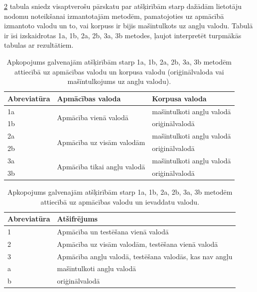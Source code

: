 \ref{tab:legend} tabula sniedz visaptverošu pārskatu par atšķirībām starp dažādām lietotāju nodomu noteikšanai izmantotajām metodēm, pamatojoties uz apmācībā izmantoto valodu un to, vai korpuss ir bijis mašīntulkots uz angļu valodu. Tabulā ir īsi izskaidrotas 1a, 1b, 2a, 2b, 3a, 3b metodes, ļaujot interpretēt turpmākās tabulas ar rezultātiem.


\begin{table}[htbp]
  \centering
  \caption{Apkopojums galvenajām atšķirībām starp 1a, 1b, 2a, 2b, 3a, 3b metodēm attiecībā uz apmācības valodu un korpusa valodu (oriģinālvaloda vai mašīntulkojums uz angļu valodu).}
    \begin{tabular}{lll}\toprule
    Abreviatūra & Apmācības valoda & Korpusa valoda \\\midrule
    1a    & \multicolumn{1}{l}{\multirow{2}[0]{*}{Apmācība vienā valodā}} & mašīntulkoti angļu valodā \\
    1b    &       & oriģinālvalodā \\\midrule
    2a    & \multicolumn{1}{l}{\multirow{2}[0]{*}{Apmācība uz visām valodām}} & mašīntulkoti angļu valodā \\
    2b    &       & oriģinālvalodā \\\midrule
    3a    & \multicolumn{1}{l}{\multirow{2}[0]{*}{Apmācība tikai angļu valodā}} & mašīntulkoti angļu valodā \\
    3b    &       & oriģinālvalodā \\\bottomrule
    \end{tabular}%
  \label{tab:legend}%
\end{table}%


\begin{table}[htbp]
  \centering
  \caption{Apkopojums galvenajām atšķirībām starp 1a, 1b, 2a, 2b, 3a, 3b metodēm attiecībā uz apmācības valodu un ievaddatu valodu.}
    \begin{tabular}{ll}\toprule
    Abreviatūra & Atšifrējums \\\midrule
    1 & Apmācība un testēšana vienā valodā \\
    2 & Apmācība uz visām valodām, testēšana vienā valodā \\
    3 & Apmācība angļu valodā, testēšana valodās, kas nav angļu \\\midrule
    a & mašīntulkoti angļu valodā \\
    b & oriģinālvalodā \\\bottomrule
    \end{tabular}%
  \label{tab:legend}%
\end{table}%



